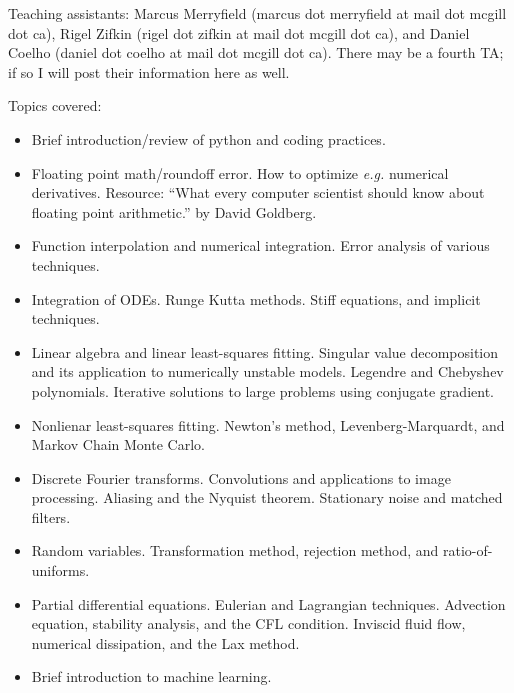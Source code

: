 \documentclass[12]{article}
\begin{document}
\noindent
Teaching assistants:  Marcus Merryfield (marcus dot merryfield at
mail dot mcgill dot ca), Rigel Zifkin (rigel dot zifkin at mail dot
mcgill dot ca), and Daniel Coelho (daniel dot coelho at mail dot
mcgill dot ca).  There may be a fourth TA; if so I will post their
information here as well.

\vskip 0.1in
\noindent Topics covered:
\begin{itemize}
\item Brief introduction/review of python and coding practices.  

\item Floating point math/roundoff error.  How to optimize
  {\textit{e.g.}} numerical derivatives.  Resource: ``What every
  computer scientist should know about floating point arithmetic.'' by
  David Goldberg.  

\item Function interpolation and numerical integration.  Error
  analysis of various techniques. 

\item Integration of ODEs. Runge Kutta methods.  Stiff equations, and
  implicit techniques.

\item Linear algebra and linear least-squares fitting.  Singular value
  decomposition and its application to numerically unstable models.
  Legendre and Chebyshev polynomials.  Iterative solutions to large
  problems using conjugate gradient.

\item Nonlienar least-squares fitting.  Newton's method,
  Levenberg-Marquardt, and Markov Chain Monte Carlo.  

\item Discrete Fourier transforms.  Convolutions and applications to
  image processing.  Aliasing and the Nyquist theorem.  Stationary
  noise and matched filters. 

\item Random variables.  Transformation method, rejection method, and
  ratio-of-uniforms.  

\item Partial differential equations. Eulerian and Lagrangian
  techniques.  Advection equation, stability analysis, and the  CFL
  condition.  Inviscid fluid flow, numerical dissipation, and the Lax
  method.  

\item Brief introduction to machine learning.

\end{itemize}
\end{document}
